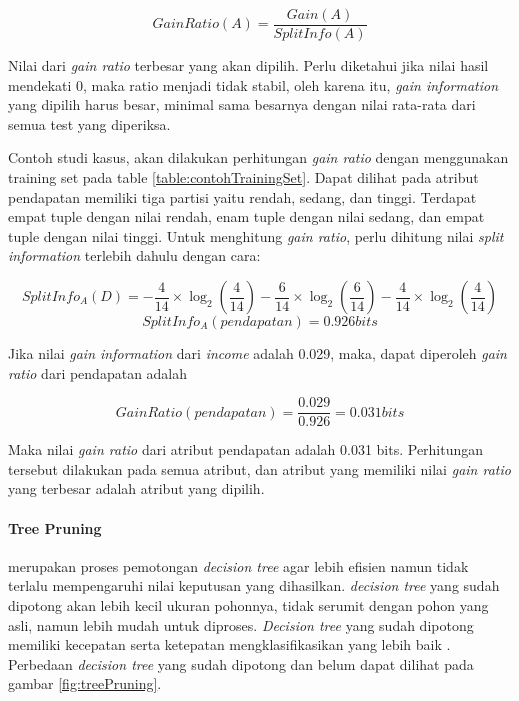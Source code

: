 \begin{displaymath}
	GainRatio(A) = \frac{Gain(A)}{SplitInfo(A)}
\end{displaymath}

Nilai dari \textsl{gain ratio} terbesar yang akan dipilih. Perlu diketahui \cite{DM} jika nilai hasil mendekati 0, maka ratio menjadi tidak stabil, oleh karena itu, \textsl{gain information} yang dipilih harus besar, minimal sama besarnya dengan nilai rata-rata dari semua test yang diperiksa.

Contoh studi kasus, akan dilakukan perhitungan \textsl{gain ratio} dengan menggunakan training set pada table \ref{table:contohTrainingSet}. Dapat dilihat pada atribut pendapatan memiliki tiga partisi yaitu rendah, sedang, dan tinggi. Terdapat empat tuple dengan nilai rendah, enam tuple dengan nilai sedang, dan empat tuple dengan nilai tinggi. Untuk menghitung \textsl{gain ratio}, perlu dihitung nilai \textsl{split information} terlebih dahulu dengan cara:

\begin{displaymath}
	SplitInfo_A(D) = - \frac{4}{14} \times \log_2 (\frac{4}{14}) - \frac{6}{14} \times \log_2 (\frac{6}{14}) - \frac{4}{14} \times \log_2 (\frac{4}{14})
\end{displaymath} 
\begin{displaymath}
	SplitInfo_A(pendapatan) = 0.926 bits
\end{displaymath} 

Jika nilai \textsl{gain information} dari \textsl{income} adalah 0.029, maka, dapat diperoleh \textsl{gain ratio} dari pendapatan adalah

\begin{displaymath}
	GainRatio(pendapatan) = \frac{0.029}{0.926} = 0.031 bits
\end{displaymath}

Maka nilai \textsl{gain ratio} dari atribut pendapatan adalah 0.031 bits. Perhitungan tersebut dilakukan pada semua atribut, dan atribut yang memiliki nilai \textsl{gain ratio} yang terbesar adalah atribut yang dipilih.

\paragraph{Tree Pruning} merupakan proses pemotongan \textsl{decision tree} agar lebih efisien namun tidak terlalu mempengaruhi nilai keputusan yang dihasilkan. \textsl{decision tree} yang sudah dipotong akan lebih kecil ukuran pohonnya, tidak serumit dengan pohon yang asli, namun lebih mudah untuk diproses. \textsl{Decision tree} yang sudah dipotong memiliki kecepatan serta ketepatan mengklasifikasikan yang lebih baik \cite{DM}. Perbedaan \textsl{decision tree} yang sudah dipotong dan belum dapat dilihat pada gambar \ref{fig:treePruning}.

